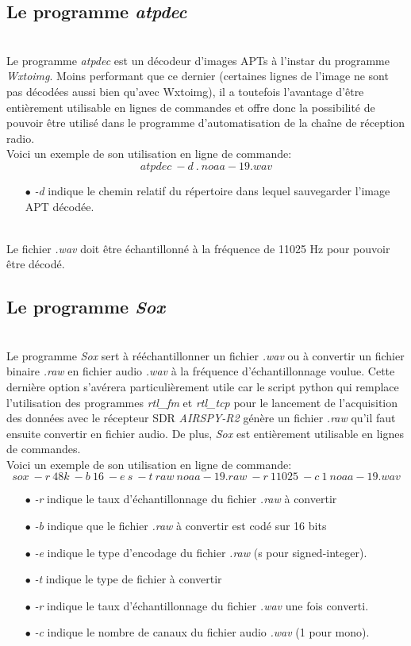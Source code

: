 \documentclass[12pt,fleqn]{book} %
\begin{document}
\subsection{Le programme \emph{atpdec}}
~\\\indent Le programme \emph{atpdec} est un décodeur d'images APTs à l'instar du programme \emph{Wxtoimg}. Moins performant que ce dernier (certaines lignes de l'image ne sont pas décodées aussi bien qu'avec Wxtoimg), il a toutefois l'avantage d'être entièrement utilisable en lignes de commandes et offre donc la possibilité de pouvoir être utilisé dans le programme d'automatisation de la chaîne de réception radio.
~\\Voici un exemple de son utilisation en ligne de commande:
$$ atpdec\ -d\ .\ noaa-19.wav $$
\begin{itemize}
 \item[$\bullet$] \emph{-d} indique le chemin relatif du répertoire dans lequel sauvegarder l'image APT décodée.
\end{itemize}
~\\Le fichier \emph{.wav} doit être échantillonné à la fréquence de 11025 Hz pour pouvoir être décodé.
\subsection{Le programme \emph{Sox}}
~\\\indent Le programme \emph{Sox} sert à rééchantillonner un fichier \emph{.wav} ou à convertir un fichier binaire \emph{.raw} en fichier audio \emph{.wav} à la fréquence d'échantillonnage voulue. Cette dernière option s'avérera particulièrement utile car le script python qui remplace l'utilisation des programmes \emph{rtl\_fm} et \emph{rtl\_tcp} pour le lancement de l'acquisition des données avec le récepteur SDR \emph{AIRSPY-R2} génère un fichier \emph{.raw} qu'il faut ensuite convertir en fichier audio. De plus, \emph{Sox} est entièrement utilisable en lignes de commandes.
~\\ Voici un exemple de son utilisation en ligne de commande:
$$ sox\ -r\ 48k\ -b\ 16\ -e\ s\ -t\ raw\ noaa-19.raw\ -r\ 11025\ -c\ 1\ noaa-19.wav $$
\begin{itemize}
 \item[$\bullet$] \emph{-r} indique le taux d'échantillonnage du fichier \emph{.raw} à convertir
 \item[$\bullet$] \emph{-b} indique que le fichier \emph{.raw} à convertir est codé sur 16 bits
 \item[$\bullet$] \emph{-e} indique le type d'encodage du fichier \emph{.raw} (s pour signed-integer).
 \item[$\bullet$] \emph{-t} indique le type de fichier à convertir
 \item[$\bullet$] \emph{-r} indique le taux d'échantillonnage du fichier \emph{.wav} une fois converti.
 \item[$\bullet$] \emph{-c} indique le nombre de canaux du fichier audio \emph{.wav} (1 pour mono).
\end{itemize}
\end{document}
